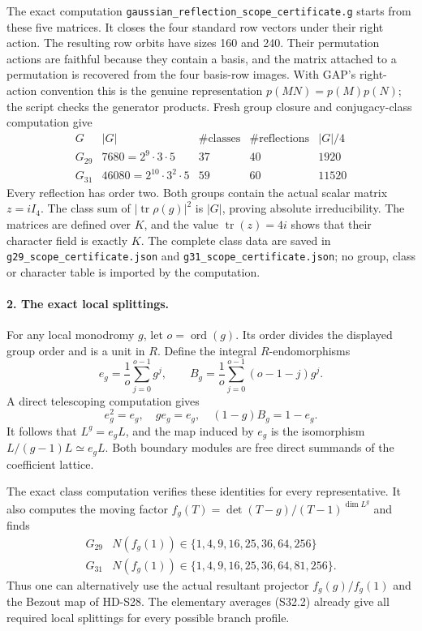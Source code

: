 The exact computation \texttt{gaussian\_reflection\_scope\_certificate.g}
starts from these five matrices. It closes the four standard row
vectors under their right action. The resulting row orbits have
sizes 160 and 240. Their permutation actions are faithful because
they contain a basis, and the matrix attached to a permutation is
recovered from the four basis-row images. With GAP's right-action
convention this is the genuine representation
\(p(MN)=p(M)p(N)\); the script checks the generator products.
Fresh group closure and conjugacy-class computation give
\[
\begin{array}{c|r|r|r|r}
G&|G|&\#\text{classes}&\#\text{reflections}&|G|/4\\\hline
G_{29}&7680=2^9\cdot3\cdot5&37&40&1920\\
G_{31}&46080=2^{10}\cdot3^2\cdot5&59&60&11520
\end{array}
\]
Every reflection has order two. Both groups contain the actual scalar
matrix \(z=iI_4\). The class sum of \(|\operatorname{tr}\rho(g)|^2\)
is \(|G|\), proving absolute irreducibility. The matrices are defined
over \(K\), and the value \(\operatorname{tr}(z)=4i\) shows that
their character field is exactly \(K\). The complete class data are
saved in \texttt{g29\_scope\_certificate.json} and
\texttt{g31\_scope\_certificate.json}; no group, class or character
table is imported by the computation.

\paragraph{2. The exact local splittings.}
For any local monodromy \(g\), let \(o=\operatorname{ord}(g)\).
Its order divides the displayed group order and is a unit in \(R\).
Define the integral \(R\)-endomorphisms
\[
 e_g=\frac1o\sum_{j=0}^{o-1}g^j,\qquad
 B_g=\frac1o\sum_{j=0}^{o-1}(o-1-j)g^j.
 \tag{S32.2}
\]
A direct telescoping computation gives
\[
 e_g^2=e_g,\quad ge_g=e_g,\quad
 (1-g)B_g=1-e_g.
\]
It follows that \(L^g=e_gL\), and the map induced by \(e_g\)
is the isomorphism \(L/(g-1)L\simeq e_gL\). Both boundary
modules are free direct summands of the coefficient lattice.

The exact class computation verifies these identities for every
representative. It also computes the moving factor
\(f_g(T)=\det(T-g)/(T-1)^{\dim L^g}\) and finds
\[
\begin{array}{c|l}
G_{29}&N(f_g(1))\in\{1,4,9,16,25,36,64,256\}\\
G_{31}&N(f_g(1))\in\{1,4,9,16,25,36,64,81,256\}.
\end{array}
\]
Thus one can alternatively use the actual resultant projector
\(f_g(g)/f_g(1)\) and the Bezout map of HD-S28. The elementary
averages (S32.2) already give all required local splittings for
every possible branch profile.

